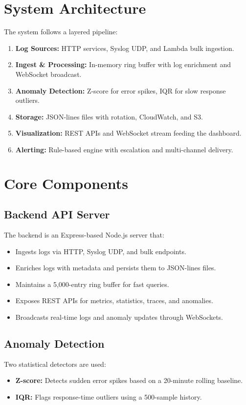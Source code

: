 \documentclass[11pt,a4paper]{article}
\begin{document}
\section{System Architecture}
The system follows a layered pipeline:
\begin{enumerate}[label=Layer \arabic*.]
  \item \textbf{Log Sources:} HTTP services, Syslog UDP, and Lambda bulk ingestion.
  \item \textbf{Ingest \& Processing:} In-memory ring buffer with log enrichment and WebSocket broadcast.
  \item \textbf{Anomaly Detection:} Z-score for error spikes, IQR for slow response outliers.
  \item \textbf{Storage:} JSON-lines files with rotation, CloudWatch, and S3.
  \item \textbf{Visualization:} REST APIs and WebSocket stream feeding the dashboard.
  \item \textbf{Alerting:} Rule-based engine with escalation and multi-channel delivery.
\end{enumerate}

\section{Core Components}
\subsection{Backend API Server}
The backend is an Express-based Node.js server that:
\begin{itemize}
  \item Ingests logs via HTTP, Syslog UDP, and bulk endpoints.
  \item Enriches logs with metadata and persists them to JSON-lines files.
  \item Maintains a 5,000-entry ring buffer for fast queries.
  \item Exposes REST APIs for metrics, statistics, traces, and anomalies.
  \item Broadcasts real-time logs and anomaly updates through WebSockets.
\end{itemize}

\subsection{Anomaly Detection}
Two statistical detectors are used:
\begin{itemize}
  \item \textbf{Z-score:} Detects sudden error spikes based on a 20-minute rolling baseline.
  \item \textbf{IQR:} Flags response-time outliers using a 500-sample history.
\end{itemize}
\end{document}

